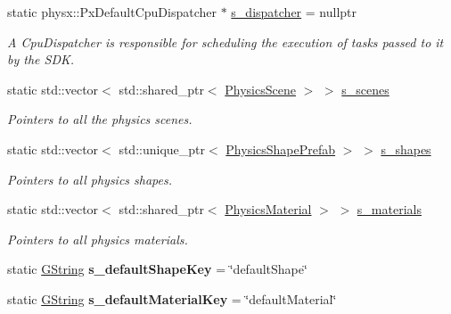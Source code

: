 \begin{DoxyCompactItemize}
\mbox{\label{classrev_1_1_physics_manager_ad381d62439da576585577523eb562248}} 
static physx\+::\+Px\+Default\+Cpu\+Dispatcher $\ast$ \mbox{\hyperlink{classrev_1_1_physics_manager_ad381d62439da576585577523eb562248}{s\+\_\+dispatcher}} = nullptr
\begin{DoxyCompactList}\small\item\em A Cpu\+Dispatcher is responsible for scheduling the execution of tasks passed to it by the S\+DK. \end{DoxyCompactList}\item 
\mbox{\label{classrev_1_1_physics_manager_aebac730ae1f1bc54c2519796307957ce}} 
static std\+::vector$<$ std\+::shared\+\_\+ptr$<$ \mbox{\hyperlink{classrev_1_1_physics_scene}{Physics\+Scene}} $>$ $>$ \mbox{\hyperlink{classrev_1_1_physics_manager_aebac730ae1f1bc54c2519796307957ce}{s\+\_\+scenes}}
\begin{DoxyCompactList}\small\item\em Pointers to all the physics scenes. \end{DoxyCompactList}\item 
\mbox{\label{classrev_1_1_physics_manager_ae766c981435e79ff59fb810932d51b80}} 
static std\+::vector$<$ std\+::unique\+\_\+ptr$<$ \mbox{\hyperlink{classrev_1_1_physics_shape_prefab}{Physics\+Shape\+Prefab}} $>$ $>$ \mbox{\hyperlink{classrev_1_1_physics_manager_ae766c981435e79ff59fb810932d51b80}{s\+\_\+shapes}}
\begin{DoxyCompactList}\small\item\em Pointers to all physics shapes. \end{DoxyCompactList}\item 
\mbox{\label{classrev_1_1_physics_manager_a4b17ac2b54368da6bf2260180adbf246}} 
static std\+::vector$<$ std\+::shared\+\_\+ptr$<$ \mbox{\hyperlink{classrev_1_1_physics_material}{Physics\+Material}} $>$ $>$ \mbox{\hyperlink{classrev_1_1_physics_manager_a4b17ac2b54368da6bf2260180adbf246}{s\+\_\+materials}}
\begin{DoxyCompactList}\small\item\em Pointers to all physics materials. \end{DoxyCompactList}\item 
\mbox{\label{classrev_1_1_physics_manager_aad74979b1352cc59f32b3b586d518406}} 
static \mbox{\hyperlink{classrev_1_1_g_string}{G\+String}} {\bfseries s\+\_\+default\+Shape\+Key} = \char`\"{}default\+Shape\char`\"{}
\item 
\mbox{\label{classrev_1_1_physics_manager_a6e84872c7ee4451188fe1f397adba8a1}} 
static \mbox{\hyperlink{classrev_1_1_g_string}{G\+String}} {\bfseries s\+\_\+default\+Material\+Key} = \char`\"{}default\+Material\char`\"{}
\end{DoxyCompactItemize}
